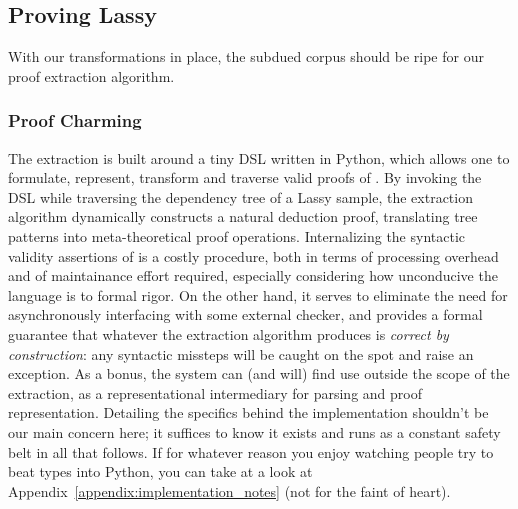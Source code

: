 \subsection{Proving Lassy}
With our transformations in place, the subdued corpus should be ripe for our proof extraction algorithm.

\subsubsection{Proof Charming}
The extraction is built around a tiny DSL written in Python, which allows one to formulate, represent, transform and traverse valid proofs of \NLPplus.
By invoking the DSL while traversing the dependency tree of a Lassy sample, the extraction algorithm dynamically constructs a natural deduction proof, translating tree patterns into meta-theoretical proof operations.
Internalizing the syntactic validity assertions of \NLPplus{} is a costly procedure, both in terms of processing overhead and of maintainance effort required, especially considering how unconducive the language is to formal rigor.
On the other hand, it serves to eliminate the need for asynchronously interfacing with some external checker, and provides a formal guarantee that whatever the extraction algorithm produces is \textit{correct by construction}: any syntactic missteps will be caught on the spot and raise an exception.
As a bonus, the system can (and will) find use outside the scope of the extraction, as a representational intermediary for parsing and proof representation.
Detailing the specifics behind the implementation shouldn't be our main concern here; it suffices to know it exists and runs as a constant safety belt in all that follows.
If for whatever reason you enjoy watching people try to beat types into Python, you can take at a look at Appendix~\ref{appendix:implementation_notes} (not for the faint of heart).

